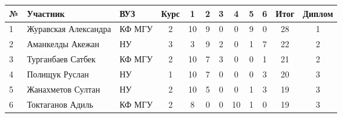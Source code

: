 \begin{center}
\begin{tabular}{|l|l|l|c|c|c|c|c|c|c|c|c|}
\hline
№ & Участник & ВУЗ & Курс & 1 & 2 & 3 & 4 & 5 & 6 & Итог & Диплом \\
\hline
1 & Журавская Александра & КФ МГУ & 2 & 10 & 9 & 0 & 0 & 9 & 0 & 28 & 1  \\
\hline
2 & Аманкелды Акежан & НУ & 3 & 3 & 9 & 2 & 0 & 1 & 7 & 22 & 2  \\
\hline
3 & Турганбаев Сатбек & КФ МГУ & 2 & 10 & 7 & 3 & 0 & 0 & 1 & 21 & 2  \\
\hline
4 & Полищук Руслан & НУ & 1 & 10 & 7 & 0 & 0 & 0 & 3 & 20 & 3  \\
\hline
5 & Жанахметов Султан & НУ & 2 & 10 & 5 & 0 & 0 & 1 & 3 & 19 & 3  \\
\hline
6 & Токтаганов Адиль & КФ МГУ & 2 & 8 & 0 & 0 & 10 & 1 & 0 & 19 & 3  \\
\hline
\end{tabular}
\end{center}